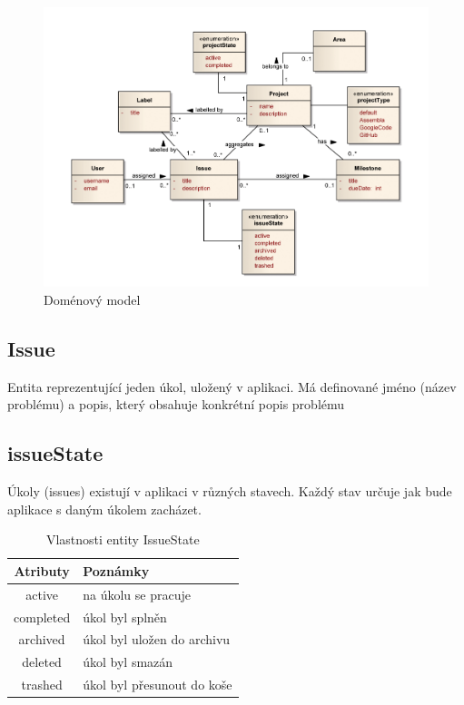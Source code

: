 \begin{figure}[h]
	\includegraphics[keepaspectratio,width=16cm]{figures/domain-model}
	\caption{Doménový model}
	\label{fig:domain-model}
\end{figure}

\subsection{Issue}
Entita reprezentující jeden úkol, uložený v aplikaci. Má definované jméno (název problému) a popis, který obsahuje konkrétní popis problému

\subsection{issueState}
Úkoly (issues) existují v aplikaci v různých stavech. Každý stav určuje jak bude aplikace s daným úkolem zacházet.

\begin{table}[h]
\begin{center}
	\begin{tabular}{|c|l|}
	\hline
	Atributy & Poznámky \\
	\hline
	active & na úkolu se pracuje \\
	completed & úkol byl splněn \\
	archived & úkol byl uložen do archivu \\
	deleted & úkol byl smazán \\
	trashed & úkol byl přesunout do koše \\
	\hline
	\end{tabular}
\end{center}
\caption{Vlastnosti entity IssueState}
\label{tab:issueState}
\end{table}

